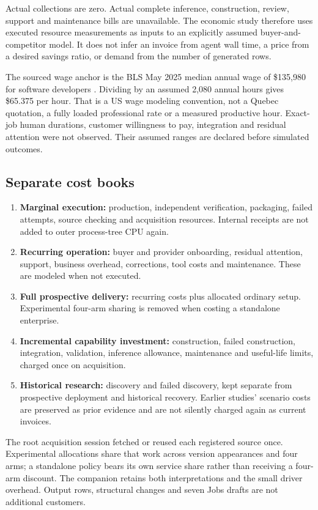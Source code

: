 \documentclass[11pt,letterpaper]{article}
\begin{document}
Actual collections are zero. Actual complete inference, construction, review, support and
maintenance bills are unavailable. The economic study therefore uses executed resource
measurements as inputs to an explicitly assumed buyer-and-competitor model. It does not infer
an invoice from agent wall time, a price from a desired savings ratio, or demand from the number
of generated rows.

The sourced wage anchor is the BLS May 2025 median annual wage of \$135,980 for software
developers \cite{bls}. Dividing by an assumed 2,080 annual hours gives \$65.375 per hour.
That is a US wage modeling convention, not a Quebec quotation, a fully loaded professional
rate or a measured productive hour. Exact-job human durations, customer willingness to pay,
integration and residual attention were not observed. Their assumed ranges are declared
before simulated outcomes.

\subsection{Separate cost books}

\begin{enumerate}
\item \textbf{Marginal execution:} production, independent verification, packaging, failed attempts,
source checking and acquisition resources. Internal receipts are not added to outer process-tree
CPU again.
\item \textbf{Recurring operation:} buyer and provider onboarding, residual attention, support,
business overhead, corrections, tool costs and maintenance. These are modeled when not executed.
\item \textbf{Full prospective delivery:} recurring costs plus allocated ordinary setup.
Experimental four-arm sharing is removed when costing a standalone enterprise.
\item \textbf{Incremental capability investment:} construction, failed construction, integration,
validation, inference allowance, maintenance and useful-life limits, charged once on acquisition.
\item \textbf{Historical research:} discovery and failed discovery, kept separate from prospective
deployment and historical recovery. Earlier studies' scenario costs are preserved as prior
evidence and are not silently charged again as current invoices.
\end{enumerate}

The root acquisition session fetched or reused each registered source once. Experimental
allocations share that work across version appearances and four arms; a standalone policy bears
its own service share rather than receiving a four-arm discount. The companion retains both
interpretations and the small driver overhead. Output rows, structural changes and seven Jobs
drafts are not additional customers.
\end{document}
